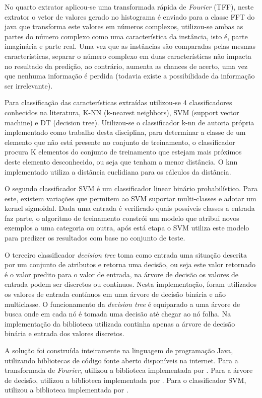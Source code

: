 \documentclass[12pt]{article}
\begin{document}
	No quarto extrator aplicou-se uma transformada rápida de \textit{Fourier} (TFF), neste extrator o vetor de valores gerado no histograma é enviado para a classe FFT do java que transforma este valores em números complexos, utilizou-se ambas as partes do número complexo como uma característica da instância, isto é, parte imaginária e parte real. Uma vez que as instâncias são comparadas pelas mesmas características, separar o número complexo em duas características não impacta no resultado da predição, ao contrário, aumenta as chances de acerto, uma vez que nenhuma informação é perdida (todavia existe a possibilidade da informação ser irrelevante).

	Para classificação das características extraídas utilizou-se 4 classificadores conhecidos na literatura, K-NN (k-nearest neighbors), SVM (support vector machine) e DT (decision tree). Utilizou-se o classificador k-nn de autoria própria implementado como trabalho desta disciplina, para determinar a classe de um elemento que não está presente no conjunto de treinamento, o classificador procura K elementos do conjunto de treinamento que estejam mais próximos deste elemento desconhecido, ou seja que tenham a menor distância. O knn implementado utiliza a distância euclidiana para os cálculos da distância.

	O segundo classificador SVM é um classificador linear binário probabilístico. Para este, existem variações que permitem ao SVM suportar multi-classes e adotar um kernel sigmoidal. Dada uma entrada é verificado quais possíveis classes a entrada faz parte, o algoritmo de treinamento constrói um modelo que atribui novos exemplos a uma categoria ou outra, após está etapa o SVM utiliza este modelo para predizer os resultados com base no conjunto de teste.

	O terceiro classificador \textit{decision tree} toma como entrada uma situação descrita por um conjunto de atributos e retorna uma decisão, ou seja este valor retornado é o valor predito para o valor de entrada, na árvore de decisão os valores de entrada podem ser discretos ou contínuos. Nesta implementação, foram utilizados os valores de entrada contínuos em uma árvore de decisão binária e não multiclasse. O funcionamento da \textit{decision tree} é equiparado a uma árvore de busca onde em cada nó é tomada uma decisão até chegar ao nó folha. Na implementação da biblioteca utilizada continha apenas a árvore de decisão binária e entrada dos valores discretos.

	A solução foi construída inteiramente na linguagem de programação Java, utilizando bibliotecas de código fonte aberto disponíveis na internet. Para a transformada de \textit{Fourier}, utilizou a biblioteca implementada por \cite{Anderson}. Para a árvore de decisão, utilizou a biblioteca implementada por \cite{Decision Tree}. Para o classificador SVM, utilizou a biblioteca implementada por \cite{CC01}.
\end{document}
